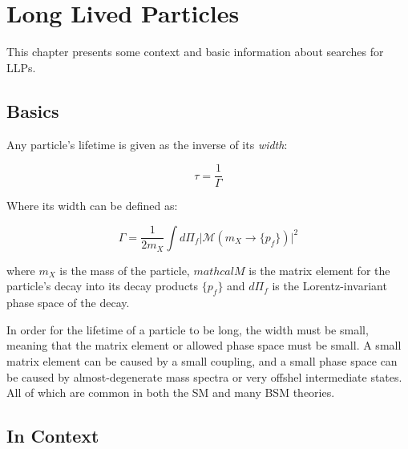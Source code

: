\chapter{Long Lived Particles}

This chapter presents some context and basic information about searches for \acp{LLP}. 

\section{Basics}

Any particle's lifetime is given as the inverse of its \emph{width}:

\begin{equation}
\tau = \frac{1}{\Gamma}
\end{equation}

Where its width can be defined as:

\begin{equation}
\Gamma = \frac{1}{2m_{X}} \int d\Pi_f \big| \mathcal{M}(m_X \rightarrow \{p_f\})\big|^2
\end{equation}

where $m_X$ is the mass of the particle, $mathcal{M}$ is the matrix element for the particle's decay into its decay products $\{p_f\}$ and $d\Pi_f$ is the Lorentz-invariant phase space of the decay. 

In order for the lifetime of a particle to be long, the width must be small, meaning that the matrix element or allowed phase space must be small. A small matrix element can be caused by a small coupling, and a small phase space can be caused by almost-degenerate mass spectra or very offshel intermediate states. All of which are common in both the \ac{SM} and many \ac{BSM} theories. 




\section{In Context}

